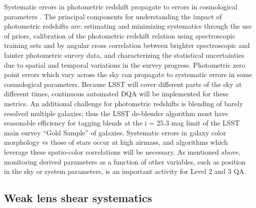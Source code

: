 \documentclass[SE,toc,lsstdraft]{lsstdoc}
\newcommand{\newtext}[1]{{\color{blue} #1}}
\begin{document}
Systematic errors in photometric redshift propagate to errors in cosmological parameters \citep{2011ApJ...734...36A}. The principal components for understanding the impact of photometric redshifts are: estimating and minimizing systematics through the use of priors, calibration of the photometric redshift relation using spectroscopic training sets and by angular cross correlation between \newtext{brighter} spectroscopic and \newtext{fainter} photometric survey data, and characterizing the statistical uncertainties due to spatial and temporal variations in the survey progress.  Photometric zero point errors \citep{2010SPIE.7737E..1FJ} which vary across the sky can propagate to systematic errors in some cosmological parameters. Because LSST will cover different parts of the sky at different times, continuous automated DQA will be implemented for these metrics.
\newtext{
An additional challenge for photometric redshifts is blending of barely resolved multiple galaxies; thus the LSST de-blender algorithm must have reasonable efficiency for tagging blends at the i = 25.3 mag limit of the LSST main survey ``Gold Sample'' of galaxies.
Systematic errors in galaxy color morphology vs those of stars occur at high airmass, and algorithms which leverage these spatio-color correlations will be necessary.
}
As mentioned above, monitoring derived parameters as a function of other variables, such as position in the sky or system parameters, is an important activity for Level 2 and 3 QA.

\subsection{Weak lens shear systematics}
\end{document}
